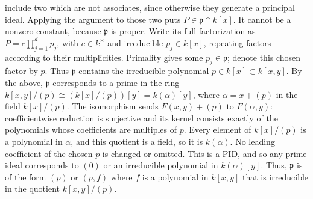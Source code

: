 \begin{example}
include two which are not associates, since otherwise they generate
a principal ideal. Applying the argument to those two puts
$P\in\mathfrak p\cap k[x]$. It cannot be a nonzero constant,
because $\mathfrak p$ is proper. Write its full factorization as
$P=c\prod_{j=1}^d p_j$, with $c\in k^\times$ and irreducible
$p_j\in k[x]$, repeating factors according to their multiplicities.
Primality gives some $p_j\in\mathfrak p$; denote this chosen
factor by $p$. Thus $\mathfrak p$ contains the irreducible
polynomial $p\in k[x]\subset k[x,y]$.
By the above, $\mathfrak p$ corresponds to a prime in the ring
$k[x,y]/(p)\cong(k[x]/(p))[y]=k(\alpha)[y]$, where
$\alpha=x+(p)$ in the field $k[x]/(p)$.
The isomorphism sends $F(x,y)+(p)$ to $F(\alpha,y)$:
coefficientwise reduction is surjective and its kernel consists
exactly of the polynomials whose coefficients are multiples of $p$.
Every element of $k[x]/(p)$ is a polynomial in $\alpha$, and this
quotient is a field, so it is $k(\alpha)$. No leading coefficient
of the chosen $p$ is changed or omitted. This is a
PID, and so any prime ideal corresponds to $(0)$ or an
irreducible polynomial in $k(\alpha)[y]$. Thus, $\mathfrak p$
is of the form $(p)$ or $(p, f)$ where $f$ is a
polynomial in $k[x, y]$ that is irreducible in the quotient
$k[x, y]/(p)$.
\end{example}